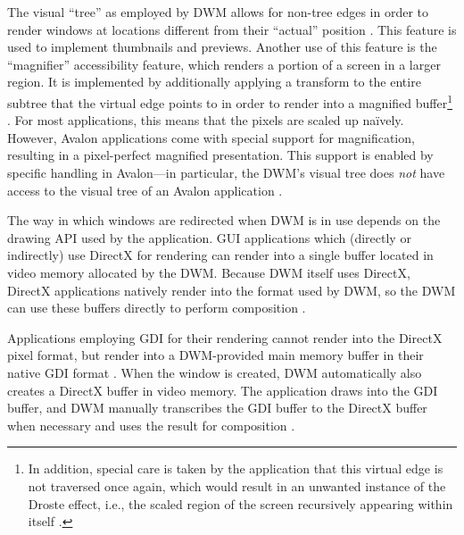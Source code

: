 			The visual \enquote{tree} as employed by DWM allows for non-tree edges
			in order to render windows at locations different from their \enquote{actual}
			position \cite{goingdeep}. This feature is used to implement thumbnails and previews.
			Another use of this feature is the \enquote{magnifier} accessibility
			feature, which renders a portion of a screen in a larger region.
			It is implemented by additionally applying a transform to the entire
			subtree that the virtual edge points to in order to render into a
			magnified buffer\footnote{In addition, special care is taken by the
			application
			that this virtual edge is not traversed once again, which would result
			in an unwanted instance of the Droste effect, i.e., the scaled region
			of the screen recursively appearing within itself
			\cite{goingdeep}.} \cite{goingdeep}.
			For most applications, this means that the pixels are scaled up naïvely.
			However, Avalon applications come with special support for magnification,
			resulting in a pixel-perfect magnified presentation. This support
			is enabled by specific handling in Avalon---in particular, the DWM's
			visual tree does \emph{not} have access to the visual tree of an
			Avalon application \cite{goingdeep}.

			The way in which windows are redirected when DWM is in use depends
			on the drawing API used by the application. GUI applications which
			(directly or indirectly)
			use DirectX for rendering can render into a single buffer located
			in video memory allocated
			by the DWM. Because DWM itself uses DirectX, DirectX applications
			natively render into the format used by DWM, so the DWM can use
			these buffers directly to perform composition
			\cite{dwmredirect}.

			Applications employing GDI for their rendering cannot render into
			the DirectX pixel format, but render into a DWM-provided main memory
			buffer in their native GDI format \cite{goingdeep}. When the window is created, DWM
			automatically also creates a DirectX buffer in video memory. The
			application draws into the GDI buffer, and DWM manually transcribes
			the GDI buffer to the DirectX buffer when necessary and uses the result
			for composition
			\cite{dwmredirect}.

